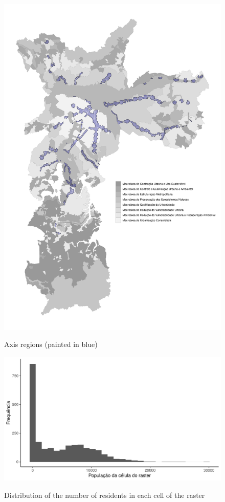 \begin{apendicesenv}
    
    \begin{figure}[!h]
        \centering
        \caption{Axis regions (painted in blue)}
        \includegraphics[width = .85\linewidth]{figuras/macroareas-eixos.pdf}
        \label{fig:eixos}
    \end{figure}
    
    \clearpage
    
    \begin{figure}[!h]
        \centering
        \caption{Distribution of the number of residents in each cell of the raster}
        \includegraphics[width = .85\linewidth]{figuras/populacao-distribuicao-raster.pdf}
        \label{fig:populacao-rasters}
    \end{figure}
    
    
    
    
    
    
    \end{apendicesenv}
        
        